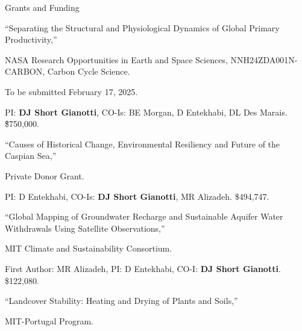 \begin{rubric}{Grants and Funding}
%
    \begin{hangparas}{1em}{1}
        \par ``Separating the Structural and Physiological Dynamics of Global Primary Productivity,'' 
        \par NASA Research Opportunities in Earth and Space Sciences, 
        NNH24ZDA001N-CARBON, Carbon Cycle Science.
        \par To be submitted February 17, 2025.
        \par PI: \textbf{DJ Short Gianotti}, CO-Is: BE Morgan, D Entekhabi, DL Des Marais. \~\$750,000.
    \end{hangparas}
% 
    \begin{hangparas}{1em}{1}
        \par ``Causes of Historical Change, Environmental Resiliency and Future of the Caspian Sea,'' 
        \par Private Donor Grant. 
        \par PI: D Entekhabi, CO-Is: \textbf{DJ Short Gianotti}, MR Alizadeh. \$494,747.
    \end{hangparas}
%
    \begin{hangparas}{1em}{1}
        \par ``Global Mapping of Groundwater Recharge and Sustainable Aquifer Water Withdrawals Using Satellite Observations,'' 
        \par MIT Climate and Sustainability Consortium. 
        \par First Author: MR Alizadeh, PI: D Entekhabi, CO-I: \textbf{DJ Short Gianotti}. \$122,080.
    \end{hangparas}
%
    \begin{hangparas}{1em}{1} 
        \par ``Landcover Stability: Heating and Drying of Plants and Soils,'' 
        \par MIT-Portugal Program. 

\end{hangparas}
\end{rubric}
